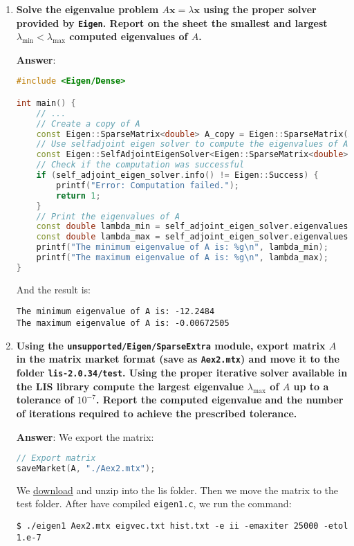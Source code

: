 \begin{enumerate}[label=\textcolor{Green3}{\textbf{\arabic*.}}]
    \newpage

    \item \textcolor{Green3}{\textbf{%
        Solve the eigenvalue problem $A\mathbf{x} = \lambda\mathbf{x}$ using the proper solver provided by \texttt{Eigen}. Report on the sheet the smallest and largest $\lambda_{\min} < \lambda_{\max}$ computed eigenvalues of $A$.
    }}

    \textbf{Answer}:
    \begin{lstlisting}[language=C++]
#include <Eigen/Dense>

int main() {
    // ...
    // Create a copy of A
    const Eigen::SparseMatrix<double> A_copy = Eigen::SparseMatrix(A);
    // Use selfadjoint eigen solver to compute the eigenvalues of A
    const Eigen::SelfAdjointEigenSolver<Eigen::SparseMatrix<double>> self_adjoint_eigen_solver(A_copy);
    // Check if the computation was successful
    if (self_adjoint_eigen_solver.info() != Eigen::Success) {
        printf("Error: Computation failed.");
        return 1;
    }
    // Print the eigenvalues of A
    const double lambda_min = self_adjoint_eigen_solver.eigenvalues()[0];
    const double lambda_max = self_adjoint_eigen_solver.eigenvalues()[n-1];
    printf("The minimum eigenvalue of A is: %g\n", lambda_min);
    printf("The maximum eigenvalue of A is: %g\n", lambda_max);
}\end{lstlisting}
    And the result is:
    \begin{lstlisting}
The minimum eigenvalue of A is: -12.2484
The maximum eigenvalue of A is: -0.00672505\end{lstlisting}


    \newpage

    \item \textcolor{Green3}{\textbf{%
        Using the \texttt{unsupported/Eigen/SparseExtra} module, export matrix $A$ in the matrix market format (save as \texttt{Aex2.mtx}) and move it to the folder \texttt{lis-2.0.34/test}. Using the proper iterative solver available in the LIS library compute the largest eigenvalue $\lambda_{\max}$ of $A$ up to a tolerance of $10^{-7}$. Report the computed eigenvalue and the number of iterations required to achieve the prescribed tolerance.
    }}

    \textbf{Answer}: We export the matrix:
    \begin{lstlisting}[language=C++]
// Export matrix
saveMarket(A, "./Aex2.mtx");\end{lstlisting}
    We \href{https://www.ssisc.org/lis/dl/lis-2.1.6.zip}{download} and unzip into the lis folder. Then we move the matrix to the test folder. After have compiled \texttt{eigen1.c}, we run the command:
    \begin{lstlisting}[mathescape=false]
$ ./eigen1 Aex2.mtx eigvec.txt hist.txt -e ii -emaxiter 25000 -etol 1.e-7


\end{lstlisting}
\end{enumerate}
